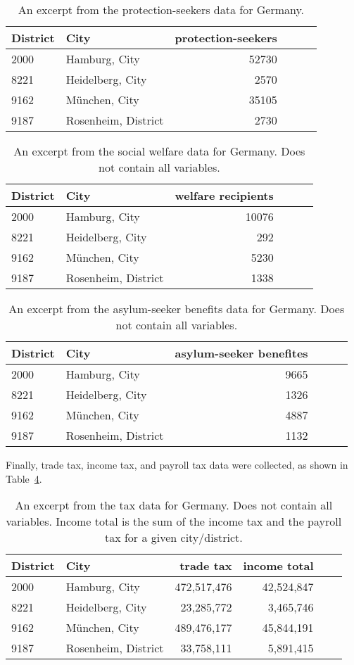 \begin{table}[H] 
\caption{An excerpt from the protection-seekers data for Germany.\label{protectionGermany}}
\begin{tabular}{l l r r r r}
\toprule
\textbf{District}	& \textbf{City}	& \textbf{protection-seekers}\\
\midrule
2000 & Hamburg, City & 52730\\
8221 & Heidelberg, City & 2570\\
9162 & München, City &  35105\\
9187 & Rosenheim, District & 2730\\
\bottomrule
\end{tabular}
\end{table}
\begin{table}[H] 
\caption{An excerpt from the social welfare data for Germany. Does not contain all variables.\label{welfareGermany}}
\begin{tabular}{l l r r r r}
\toprule
\textbf{District}	& \textbf{City}	& \textbf{welfare recipients}\\
\midrule
2000 & Hamburg, City & 10076\\
8221 & Heidelberg, City & 292\\
9162 & München, City &  5230\\
9187 & Rosenheim, District & 1338\\
\bottomrule
\end{tabular}
\end{table}
\begin{table}[H] 
\caption{An excerpt from the asylum-seeker benefits data for Germany. Does not contain all variables.\label{asylumGermany}}
\begin{tabular}{l l r r r r}
\toprule
\textbf{District}	& \textbf{City}	& \textbf{asylum-seeker benefites}\\
\midrule
2000 & Hamburg, City & 9665\\
8221 & Heidelberg, City & 1326\\
9162 & München, City &  4887\\
9187 & Rosenheim, District & 1132\\
\bottomrule
\end{tabular}
\end{table}
Finally, trade tax, income tax, and payroll tax data were collected, as shown in Table~\ref{taxGermany}.
\begin{table}[H] 
\caption{An excerpt from the tax data for Germany. Does not contain all variables. Income total is the sum of the income tax and the payroll tax for a given city/district.\label{taxGermany}}
\begin{tabular}{l l r r r r}
\toprule
\textbf{District}	& \textbf{City}	& \textbf{trade tax}& \textbf{income total}\\
\midrule
2000 & Hamburg, City & 472,517,476 & 42,524,847\\
8221 & Heidelberg, City & 23,285,772 & 3,465,746\\
9162 & München, City &  489,476,177 & 45,844,191 \\
9187 & Rosenheim, District & 33,758,111 & 5,891,415 \\
\bottomrule
\end{tabular}
\end{table}
